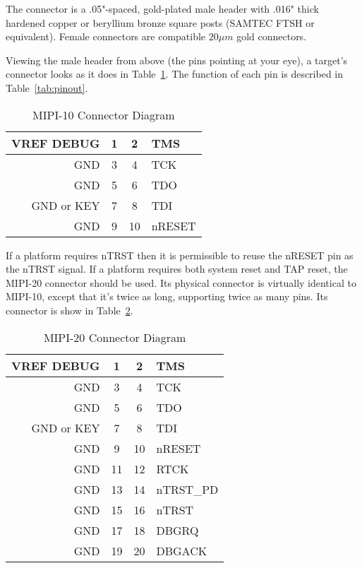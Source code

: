 The connector is a .05"-spaced, gold-plated male header with .016" thick
hardened copper or beryllium bronze square posts (SAMTEC FTSH or equivalent).
Female connectors are compatible $20\mu m$ gold connectors.

Viewing the male header from above (the pins pointing at your eye), a target's
connector looks as it does in Table~\ref{tab:mipiten}.  The function of each pin
is described in Table~\ref{tab:pinout}.

\begin{table}[htp]
    \centering
    \caption{MIPI-10 Connector Diagram}
    \label{tab:mipiten}
    \begin{tabular}{|r|c|c|l|}
        \hline
        VREF DEBUG & 1 & 2 & TMS \\
        \hline
        GND & 3 & 4 & TCK \\
        \hline
        GND & 5 & 6 & TDO \\
        \hline
        GND or KEY & 7 & 8 & TDI \\
        \hline
        GND & 9 & 10 & nRESET \\
        \hline
    \end{tabular}
\end{table}

If a platform requires nTRST then it is permissible to reuse the nRESET pin as
the nTRST signal.  If a platform requires both system reset and TAP reset, the
MIPI-20 connector should be used. Its physical connector is virtually identical
to MIPI-10, except that it's twice as long, supporting twice as many pins. Its
connector is show in Table~\ref{tab:mipitwenty}.

\begin{table}[htp]
    \centering
    \caption{MIPI-20 Connector Diagram}
    \label{tab:mipitwenty}
    \begin{tabular}{|r|c|c|l|}
        \hline
        VREF DEBUG & 1 & 2 & TMS \\
        \hline
        GND & 3 & 4 & TCK \\
        \hline
        GND & 5 & 6 & TDO \\
        \hline
        GND or KEY & 7 & 8 & TDI \\
        \hline
        GND & 9 & 10 & nRESET \\
        \hline
        GND & 11 & 12 & RTCK \\
        \hline
        GND & 13 & 14 & nTRST\_PD \\
        \hline
        GND & 15 & 16 & nTRST \\
        \hline
        GND & 17 & 18 & DBGRQ \\
        \hline
        GND & 19 & 20 & DBGACK \\
        \hline
    \end{tabular}
\end{table}

